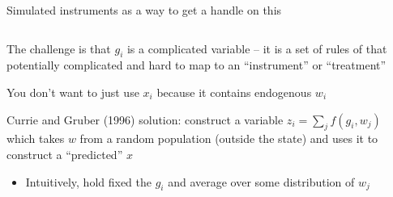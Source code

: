 \documentclass[notes,11pt, aspectratio=169]{beamer}
\newenvironment{wideitemize}{\itemize\addtolength{\itemsep}{10pt}}{\enditemize}
\begin{document}
\begin{frame}{Simulated instruments as a  way to get a handle on this}
\begin{columns}[T] %
\begin{column}{.5\textwidth}
  \begin{wideitemize}
  \item The challenge is that $g_{i}$ is a complicated variable -- it
    is a set of rules of that potentially complicated and hard to map
    to an ``instrument'' or ``treatment''
  \item You don't want to just use $x_{i}$ because it contains endogenous $w_{i}$
  \item Currie and Gruber (1996) solution: construct a variable
    $z_{i} = \sum_{j} f(g_{i}, w_{j})$ which takes $w$ from a random
    population (outside the state) and uses it to construct a
    ``predicted'' $x$
    \begin{itemize}
    \item Intuitively, hold fixed the $g_{i}$ and average over some
      distribution of $w_j$
    \end{itemize}
  \end{wideitemize}
\end{column}%
\hfill%
\begin{column}{.5\textwidth}
\end{column}
\end{columns}
\end{frame}
\end{document}
